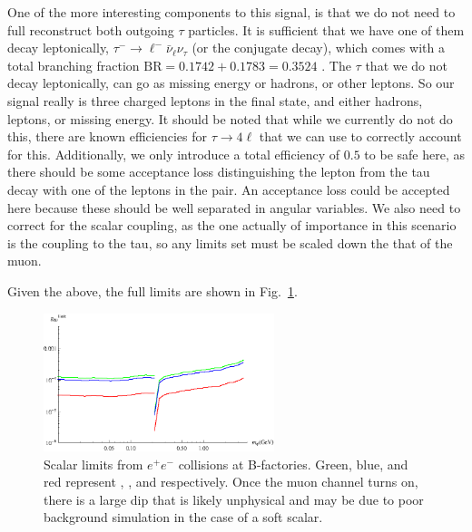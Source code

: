 One of the more interesting components to this signal, is that we do not need to full reconstruct both outgoing $\tau$ particles.
It is sufficient that we have one of them decay leptonically, $\tau^- \rightarrow \ell^- \bar{\nu}_\ell \nu_\tau$ (or the conjugate decay), which comes with a total branching fraction $\textrm{BR} = 0.1742 + 0.1783 = 0.3524$ \cite{Agashe:2014kda}.
The $\tau$ that we do not decay leptonically, can go as missing energy or hadrons, or other leptons.
So our signal really is three charged leptons in the final state, and either hadrons, leptons, or missing energy.
It should be noted that while we currently do not do this, there are known efficiencies for $\tau \rightarrow 4\ell$ that we can use to correctly account for this.
Additionally, we only introduce a total efficiency of $0.5$ to be safe here, as there should be some acceptance loss distinguishing the lepton from the tau decay with one of the leptons in the pair.
An acceptance loss could be accepted here because these should be well separated in angular variables.
We also need to correct for the scalar coupling, as the one actually of importance in this scenario is the coupling to the tau, so any limits set must be scaled down the that of the muon.

Given the above, the full limits are shown in Fig.\ \ref{fig:ee_limits}.

\begin{figure}[h]
    \centering
    \includegraphics[width=0.6\textwidth]{Figures/limits/ee_all}
    \caption{Scalar limits from $e^+ e^-$ collisions at B-factories. Green, blue, and red represent \babar, \belle, and \belleii respectively. Once the muon channel turns on, there is a large dip that is likely unphysical and may be due to poor background simulation in the case of a soft scalar.}
    \label{fig:ee_limits}
\end{figure}
